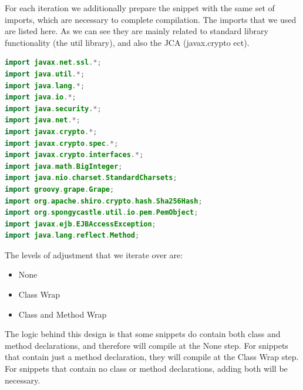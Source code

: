 \documentclass[10pt, conference]{IEEEtran}
\begin{document}
For each iteration we additionally prepare the snippet with the same set of imports, which are necessary to complete compilation. The imports that we used are listed here. As we can see they are mainly related to standard library functionality (the util library), and also the JCA (javax.crypto ect). 

\begin{lstlisting}[language=java]
import javax.net.ssl.*;                                                                        
import java.util.*;                                                                                     
import java.lang.*;                                                                                     
import java.io.*;                                                                                       
import java.security.*;                                                                                 
import java.net.*;                                                                                      
import javax.crypto.*;
import javax.crypto.spec.*;
import javax.crypto.interfaces.*;
import java.math.BigInteger;                                                                            
import java.nio.charset.StandardCharsets;                                                               
import groovy.grape.Grape;                                                                              
import org.apache.shiro.crypto.hash.Sha256Hash;                                                         
import org.spongycastle.util.io.pem.PemObject;                                                          
import javax.ejb.EJBAccessException;                                                                    
import java.lang.reflect.Method;
\end{lstlisting}


The levels of adjustment that we iterate over are:

\begin{itemize}
\item
None
\item
Class Wrap
\item
Class and Method Wrap
\end{itemize}

The logic behind this design is that some snippets do contain both class and method declarations, and therefore will compile at the None step. For snippets that contain just a method declaration, they will compile at the Class Wrap step. For snippets that contain no class or method declarations, adding both will be necessary.
\end{document}
